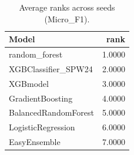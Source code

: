 \begin{table}[t]
\centering
\begin{tabular}{lr}
\toprule
Model & rank \\
\midrule
random_forest & 1.0000 \\
XGBClassifier_SPW24 & 2.0000 \\
XGBmodel & 3.0000 \\
GradientBoosting & 4.0000 \\
BalancedRandomForest & 5.0000 \\
LogisticRegression & 6.0000 \\
EasyEnsemble & 7.0000 \\
\bottomrule
\end{tabular}
\caption{Average ranks across seeds (Micro_F1).}
\label{tab:avg_rank_Micro_F1}
\end{table}
